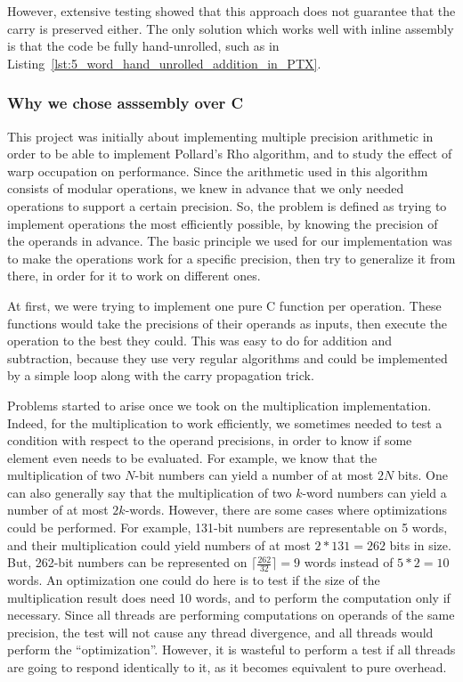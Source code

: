 \documentclass[10pt, a4paper]{report}
\begin{document}
However, extensive testing showed that this approach does not guarantee that the
carry is preserved either.
The only solution which works well with inline assembly is that the code be
fully hand-unrolled, such as in
Listing~\ref{lst:5_word_hand_unrolled_addition_in_PTX}.

\subsubsection{Why we chose asssembly over C}
This project was initially about implementing multiple precision arithmetic in
order to be able to implement Pollard's Rho algorithm, and to study the effect
of warp occupation on performance.
Since the arithmetic used in this algorithm consists of modular operations, we
knew in advance that we only needed operations to support a certain precision.
So, the problem is defined as trying to implement operations the most
efficiently possible, by knowing the precision of the operands in advance.
The basic principle we used for our implementation was to make the operations
work for a specific precision, then try to generalize it from there, in order
for it to work on different ones.

At first, we were trying to implement one pure C function per operation.
These functions would take the precisions of their operands as inputs, then
execute the operation to the best they could.
This was easy to do for addition and subtraction, because they use very regular
algorithms and could be implemented by a simple loop along with the carry
propagation trick.

Problems started to arise once we took on the multiplication implementation.
Indeed, for the multiplication to work efficiently, we sometimes needed to test
a condition with respect to the operand precisions, in order to know if some
element even needs to be evaluated.
For example, we know that the multiplication of two $N$-bit numbers can yield a
number of at most $2N$ bits.
One can also generally say that the multiplication of two $k$-word numbers can
yield a number of at most $2k$-words.
However, there are some cases where optimizations could be performed.
For example, 131-bit numbers are representable on 5 words, and their
multiplication could yield numbers of at most $2*131=262$ bits in size.
But, 262-bit numbers can be represented on $\lceil \frac{262}{32} \rceil = 9$
words instead of $5*2=10$ words.
An optimization one could do here is to test if the size of the multiplication
result does need 10 words, and to perform the computation only if necessary.
Since all threads are performing computations on operands of the same precision,
the test will not cause any thread divergence, and all threads would perform the
``optimization''.
However, it is wasteful to perform a test if all threads are going to respond
identically to it, as it becomes equivalent to pure overhead.
\end{document}
